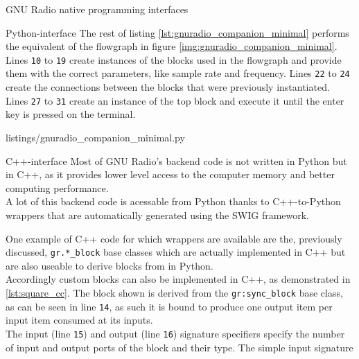 \begin{subchapter}{GNU Radio native programming interfaces}
\begin{subsubchapter}{Python-interface}
    \noindent The rest of listing \ref{lst:gnuradio_companion_minimal}
    performs the equivalent of the flowgraph in figure
    \ref{img:gnuradio_companion_minimal}. \\

    Lines \texttt{10} to \texttt{19} create instances of the
    blocks used in the flowgraph and provide them with the
    correct parameters, like sample rate and frequency.
    Lines \texttt{22} to \texttt{24} create the connections
    between the blocks that were previously instantiated.
    Lines \texttt{27} to \texttt{31} create an instance of the
    top block and execute it until the enter key is pressed
    on the terminal.

    
                    {listings/gnuradio_companion_minimal.py}

  \end{subsubchapter}

  \begin{subsubchapter}{C++-interface}
    Most of GNU Radio's backend code is not written in Python
    but in C++, as it provides lower level access to the computer
    memory and better computing performance. \\

    A lot of this backend code is acessable from Python
    thanks to C++-to-Python wrappers that are automatically
    generated using the SWIG \cite{swigweb} framework.

    One example of C++ code for which wrappers are available
    are the, previously discussed, \texttt{gr.*\_block}
    base classes which are actually implemented in C++
    but are also useable to derive blocks from in Python. \\

    Accordingly custom blocks can also be implemented in
    C++, as demonstrated in \autoref{lst:square_cc}.
    The block shown is derived from the \texttt{gr:sync\_block}
    base class, as can be seen in line \texttt{14}, as
    such it is bound to produce one output item
    per input item consumed at its inputs. \\

    The input (line \texttt{15}) and output (line \texttt{16})
    signature specifiers specify the number of input and output
    ports of the block and their type.
    The simple input signature


\end{subsubchapter}
\end{subchapter}
